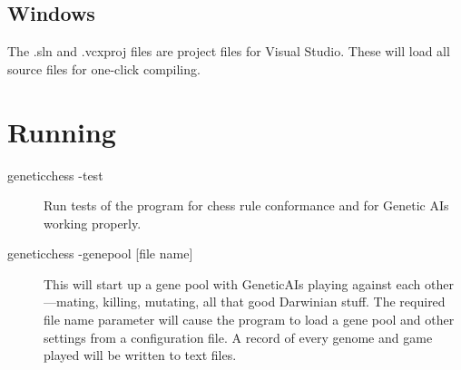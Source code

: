 \documentclass[letterpaper]{article}
\newcommand{\code}[1]{\small\textsf{#1}}
\renewcommand{\_}{\allowbreak\textunderscore\allowbreak}
\begin{document}
\subsection{Windows}
The \code{.sln} and \code{.vcxproj} files are project files for Visual Studio. These will load all source files for one-click compiling.


\section{Running}\label{running}
\begin{description}
	\item[\code{genetic\_chess -test}] Run tests of the program for chess rule conformance and for Genetic AIs working properly.
	\item[\code{genetic\_chess -genepool [file name]}]
This will start up a gene pool with Genetic\_AIs playing against each other---mating, killing, mutating, all that good Darwinian stuff. The required file name parameter will cause the program to load a gene pool and other settings from a configuration file. A record of every genome and game played will be written to text files.


\end{description}
\end{document}

